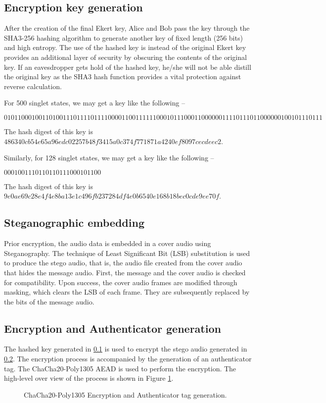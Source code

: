 \documentclass{article}
\begin{document}
\subsection{Encryption key generation}
\label{sec:keyGen}
After the creation of the final Ekert key, Alice and Bob pass the key through the SHA3-256 hashing algorithm to generate another key of fixed length (256 bits) and high entropy. The use of the hashed key is instead of the original Ekert key provides an additional layer of security by obscuring the contents of the original key. If an eavesdropper gets hold of the hashed key, he/she will not be able distill the original key as the SHA3 hash function provides a vital protection against reverse calculation.

For 500 singlet states, we may get a key like the following --

$01011000100110100111011110111100001100111111000101110001100000011110111011000000100101110111$

The hash digest of this key is $486340cb54e65a96edc02257b48f3415a0c374f771871a4240ef8097cecdeec2$.

Similarly, for 128 singlet states, we may get a key like the following --

$0001001110110110111000101100$

The hash digest of this key is $9e0ae69c28e4f4e8ba13e1c496fb237284df4e0b6540e168b18bec0cde9ee70f$.
\subsection{Steganographic embedding}
\label{sec:stegoEncode}
Prior encryption, the audio data is embedded in a cover audio using Steganography. The technique of Least Significant Bit (LSB) substitution is used to produce the stego audio, that is, the audio file created from the cover audio that hides the message audio. First, the message and the cover audio is checked for compatibility. Upon success, the cover audio frames are modified through masking, which clears the LSB of each frame. They are subsequently replaced by the bits of the message audio.
\subsection{Encryption and Authenticator generation}
The hashed key generated in \ref{sec:keyGen} is used to encrypt the stego audio generated in \ref{sec:stegoEncode}. The encryption process is accompanied by the generation of an authenticator tag. The ChaCha20-Poly1305 AEAD is used to perform the encryption. The high-level over view of the process is shown in Figure \ref{fig:chacha20poly1305encryption}.
\begin{figure}[!h]
    \centering
    
    \caption{ChaCha20-Poly1305 Encryption and Authenticator tag generation.}
    \label{fig:chacha20poly1305encryption}
\end{figure}
\end{document}
